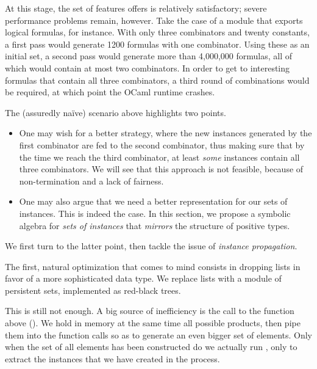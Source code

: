 At this stage, the set of features \arti offers is relatively satisfactory;
severe performance problems remain, however. Take the case of a module that
exports logical formulas, for instance. With only three combinators and twenty
constants, a first pass would generate 1200 formulas with one combinator. Using
these as an initial set, a second pass would generate more than 4,000,000
formulas, all of which would contain at most two combinators. In order to get to
interesting formulas that contain all three combinators, a third round of
combinations would be required, at which point the OCaml runtime crashes.

The (assuredly naïve) scenario above highlights two points.
\begin{itemize}
  \item One may wish for a better strategy, where the new instances generated by
    the first combinator are fed to the second combinator, thus making sure that
    by the time we reach the third combinator, at least \emph{some} instances
    contain all three combinators. We will see that this approach is not
    feasible, because of non-termination and a lack of fairness.
  \item One may also argue that we need a better representation for our sets of
    instances. This is indeed the case. In this section, we propose a symbolic
    algebra for \emph{sets of instances} that \emph{mirrors} the structure of
    positive types.
\end{itemize}
%
We first turn to the latter point, then tackle the issue of \emph{instance
propagation}.

The first, natural optimization that comes to mind consists in dropping lists in
favor of a more sophisticated data type. We replace lists with a module
 of persistent sets, implemented as red-black trees.

This is still not enough. A big source of inefficiency is the call to the
 function above (). We hold in memory
at the same time all possible products, then pipe them into the function calls
so as to generate an even bigger set of elements. Only when the set of all
elements has been constructed do we actually run , only to
extract the instances that we have created in the process.

